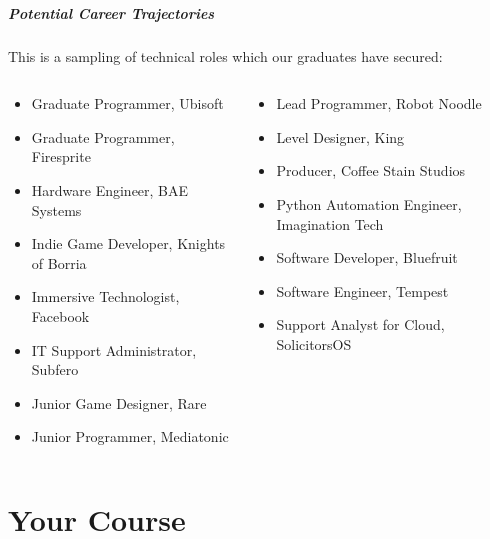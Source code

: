 \begin{frame}
	\frametitle{Potential Career Trajectories}
	
	This is a sampling of technical roles which our graduates have secured:
	
	\begin{columns}
		\begin{column}{0.5\textwidth}
			\begin{itemize}
				\item Graduate Programmer, Ubisoft
				\item Graduate Programmer, Firesprite
				\item Hardware Engineer, BAE Systems
				\item Indie Game Developer, Knights of Borria
				\item Immersive Technologist, Facebook
				\item IT Support Administrator, Subfero
				\item Junior Game Designer, Rare
				\item Junior Programmer, Mediatonic
			\end{itemize}
		\end{column}
		\begin{column}{0.5\textwidth}
			\begin{itemize}
				\item Lead Programmer, Robot Noodle
				\item Level Designer, King
				\item Producer, Coffee Stain Studios
				\item Python Automation Engineer, Imagination Tech
				\item Software Developer, Bluefruit
				\item Software Engineer, Tempest
				\item Support Analyst for Cloud, SolicitorsOS
			\end{itemize}
		\end{column}
	\end{columns}
\end{frame}

\fontsize{11pt}{7.2}\selectfont




\part{Your Course}
\frame{\partpage}

